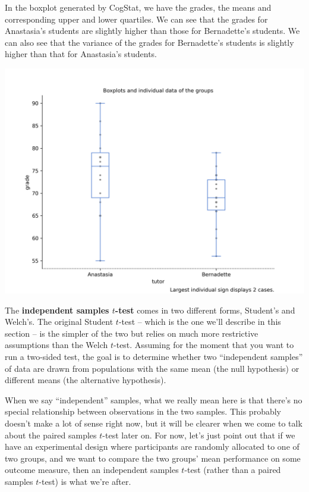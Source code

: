 \documentclass[
  11pt,
  a4paper,
  twoside,symmetric,openright]{book}
\theoremstyle{break}
\theoremstyle{break}
\begin{document}
In the boxplot generated by CogStat, we have the grades, the means and corresponding upper and lower quartiles. We can see that the grades for Anastasia's students are slightly higher than those for Bernadette's students. We can also see that the variance of the grades for Bernadette's students is slightly higher than that for Anastasia's students.

\begin{center}\includegraphics[width=0.6\linewidth]{resources/image/cogstatharpoboxplot} \end{center}

The \textbf{independent samples \(t\)-test} comes in two different forms, Student's and Welch's. The original Student \(t\)-test -- which is the one we'll describe in this section -- is the simpler of the two but relies on much more restrictive assumptions than the Welch \(t\)-test. Assuming for the moment that you want to run a two-sided test, the goal is to determine whether two ``independent samples'' of data are drawn from populations with the same mean (the null hypothesis) or different means (the alternative hypothesis).

When we say ``independent'' samples, what we really mean here is that there's no special relationship between observations in the two samples. This probably doesn't make a lot of sense right now, but it will be clearer when we come to talk about the paired samples \(t\)-test later on. For now, let's just point out that if we have an experimental design where participants are randomly allocated to one of two groups, and we want to compare the two groups' mean performance on some outcome measure, then an independent samples \(t\)-test (rather than a paired samples \(t\)-test) is what we're after.
\end{document}
